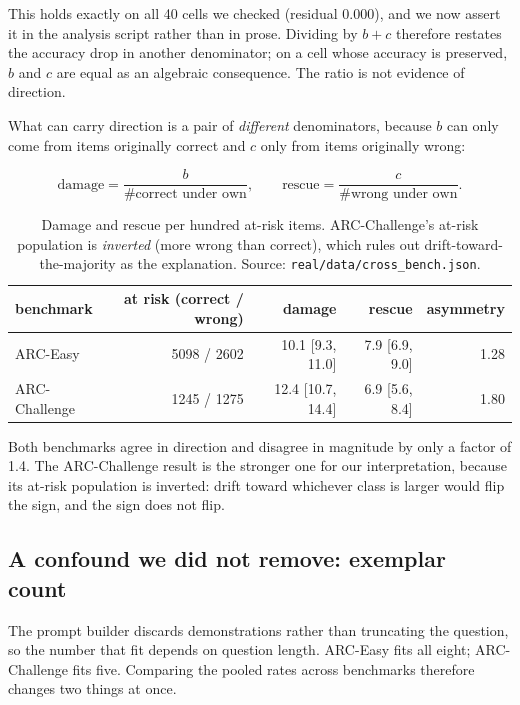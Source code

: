 \documentclass[10pt]{article}
\begin{document}
This holds exactly on all 40 cells we checked (residual 0.000), and we now
assert it in the analysis script rather than in prose. Dividing by $b+c$
therefore restates the accuracy drop in another denominator; on a cell whose
accuracy is preserved, $b$ and $c$ are equal as an algebraic consequence. The
ratio is not evidence of direction.

What can carry direction is a pair of \emph{different} denominators, because
$b$ can only come from items originally correct and $c$ only from items
originally wrong:

\begin{equation}
\text{damage} = \frac{b}{\#\text{correct under own}}, \qquad
\text{rescue} = \frac{c}{\#\text{wrong under own}}.
\end{equation}

\begin{table}[h]
\centering
\caption{Damage and rescue per hundred at-risk items. ARC-Challenge's at-risk
population is \emph{inverted} (more wrong than correct), which rules out
drift-toward-the-majority as the explanation. Source:
\texttt{real/data/cross\_bench.json}.}
\label{tab:atrisk}
\begin{tabular}{lrrrr}
\toprule
benchmark & at risk (correct / wrong) & damage & rescue & asymmetry \\
\midrule
ARC-Easy & 5098 / 2602 & 10.1 [9.3, 11.0] & 7.9 [6.9, 9.0] & 1.28 \\
ARC-Challenge & 1245 / 1275 & 12.4 [10.7, 14.4] & 6.9 [5.6, 8.4] & 1.80 \\
\bottomrule
\end{tabular}
\end{table}

Both benchmarks agree in direction and disagree in magnitude by only a
factor of 1.4. The ARC-Challenge result is the stronger one for our
interpretation, because its at-risk population is inverted: drift toward
whichever class is larger would flip the sign, and the sign does not flip.

\subsection{A confound we did not remove: exemplar count}

The prompt builder discards demonstrations rather than truncating the
question, so the number that fit depends on question length. ARC-Easy fits
all eight; ARC-Challenge fits five. Comparing the pooled rates across
benchmarks therefore changes two things at once.
\end{document}

